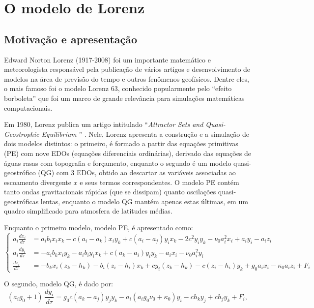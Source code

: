 \chapter{O modelo de Lorenz}

\section{Motivação e apresentação}
Edward Norton Lorenz (1917-2008) foi um importante matemático e meteorologista responsável pela publicação de vários artigos e desenvolvimento de modelos na área de previsão do tempo e outros fenômenos geofísicos. Dentre eles, o mais famoso foi o modelo Lorenz 63, conhecido popularmente pelo ``efeito borboleta'' que foi um marco de grande relevância para simulações matemáticas computacionais.

Em 1980, Lorenz publica um artigo intitulado ``\textit{Attractor Sets and Quasi-Geostrophic Equilibrium }'' \citep{Lorenz1980}. Nele, Lorenz apresenta a construção e a simulação de dois modelos distintos: o primeiro, é formado a partir das equações primitivas (PE) com nove EDOs (equações diferenciais ordinárias), derivado das equações de águas rasas com topografia e forçamento, enquanto o segundo é um modelo quasi-geostrófico (QG) com 3 EDOs, obtido ao descartar as variáveis associadas ao escoamento divergente $x$ e seus termos correspondentes. O modelo PE contém tanto ondas gravitacionais rápidas (que se dissipam) quanto oscilações quasi-geostróficas lentas, enquanto o modelo QG mantém apenas estas últimas, em um quadro simplificado para atmosfera de latitudes médias.

Enquanto o primeiro modelo, modelo PE, é apresentado como:
\begin{equation}
\left\{
\begin{aligned}
    a_i\frac{dx_i}{d\tau} &= a_ib_ix_ix_k - c(a_i - a_k)x_iy_k  + c(a_i - a_j)y_ix_k -2c^2y_iy_k - \nu_0a_i^2x_i + a_iy_i - a_iz_i \\
    a_i\frac{dy_i}{d\tau} &= -a_ib_kx_iy_k - a_ib_iy_ix_k + c(a_k - a_i)y_iy_k - a_ix_i - \nu_0a_i^2y_i \\
    \frac{dz_i}{d\tau} &= -b_kx_i(z_k - h_k) - b_i(z_i - h_i)x_k + cy_i(z_k - h_k) - c(z_i - h_i)y_k + g_0a_ix_i - \kappa_0a_iz_i + F_i
\end{aligned}
\right.
\label{eq:modelo_lorenz_deterministico_pe}
\end{equation}


O segundo, modelo QG, é dado por:
\begin{equation}
     (a_i g_0 + 1)\,\frac{dy_i}{d\tau} 
     = g_0 c (a_k - a_j) y_j y_k 
     - a_i (a_i g_0 \nu_0 + \kappa_0) y_i 
     - c h_k y_j + c h_j y_k + F_i,
     \label{eq:modelo_lorenz_deterministico_qg}
\end{equation}

